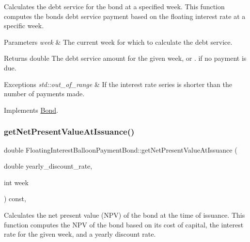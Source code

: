 Calculates the debt service for the bond at a specified week. This function computes the bond\textquotesingle{}s debt service payment based on the floating interest rate at a specific week. 


\begin{DoxyParams}{Parameters}
{\em week} & The current week for which to calculate the debt service.\\
\hline
\end{DoxyParams}
\begin{DoxyReturn}{Returns}
double The debt service amount for the given week, or {.} if no payment is due.
\end{DoxyReturn}

\begin{DoxyExceptions}{Exceptions}
{\em std\+::out\+\_\+of\+\_\+range} & If the interest rate series is shorter than the number of payments made. \\
\hline
\end{DoxyExceptions}


Implements \mbox{\hyperlink{classBond_a98d8ecaf4b36319674ebd220598996bc}{Bond}}.

\mbox{\label{classFloatingInterestBalloonPaymentBond_a90205e26e09eef1227f8c0671ca4fce2}} 
\subsubsection{\texorpdfstring{get\+Net\+Present\+Value\+At\+Issuance()}{getNetPresentValueAtIssuance()}}
{\footnotesize\ttfamily double Floating\+Interest\+Balloon\+Payment\+Bond\+::get\+Net\+Present\+Value\+At\+Issuance (\begin{DoxyParamCaption}\item[{double}]{yearly\+\_\+discount\+\_\+rate,  }\item[{int}]{week }\end{DoxyParamCaption}) const\hspace{0.3cm}{\ttfamily [override]}, {\ttfamily [virtual]}}



Calculates the net present value (N\+PV) of the bond at the time of issuance. This function computes the N\+PV of the bond based on its cost of capital, the interest rate for the given week, and a yearly discount rate. 


